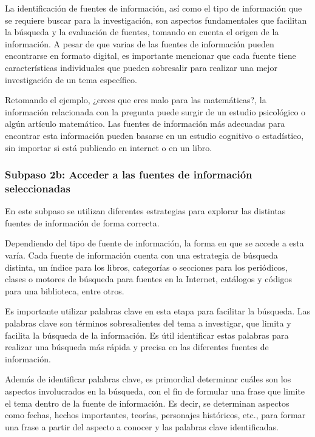La identificación de fuentes de información, así como el tipo de información que se requiere buscar para la investigación, son aspectos fundamentales que facilitan la búsqueda y la evaluación de fuentes, tomando en cuenta el origen de la información. A pesar de que varias de las fuentes de información pueden encontrarse en formato digital, es importante mencionar que cada fuente tiene características individuales que pueden sobresalir para realizar una mejor investigación de un tema específico.

Retomando el ejemplo, ¿crees que eres malo para las matemáticas?, la información relacionada con la pregunta puede surgir de un estudio psicológico o algún artículo matemático. Las fuentes de información más adecuadas para encontrar esta información pueden basarse en un estudio cognitivo o estadístico, sin importar si está publicado en internet o en un libro.


\subsubsection{Subpaso 2b: Acceder a las fuentes de información seleccionadas}
\label{secPaso2bCap2}

En este subpaso se utilizan diferentes estrategias para explorar las distintas fuentes de información de forma correcta.

Dependiendo del tipo de fuente de información, la forma en que se accede a esta varía. Cada fuente de información cuenta con una estrategia de búsqueda distinta, un índice para los libros, categorías o secciones para los periódicos, clases o motores de búsqueda para fuentes en la Internet, catálogos y códigos para una biblioteca, entre otros.

Es importante utilizar palabras clave en esta etapa para facilitar la búsqueda. Las palabras clave son términos sobresalientes del tema a investigar, que limita y facilita la búsqueda de la información. Es útil identificar estas palabras para realizar una búsqueda más rápida y precisa en las diferentes fuentes de información.

Además de identificar palabras clave, es primordial determinar cuáles son los aspectos involucrados en la búsqueda, con el fin de formular una frase que limite el tema dentro de la fuente de información. Es decir, se determinan aspectos como fechas, hechos importantes, teorías, personajes históricos, etc., para formar una frase a partir del aspecto a conocer y las palabras clave identificadas.

